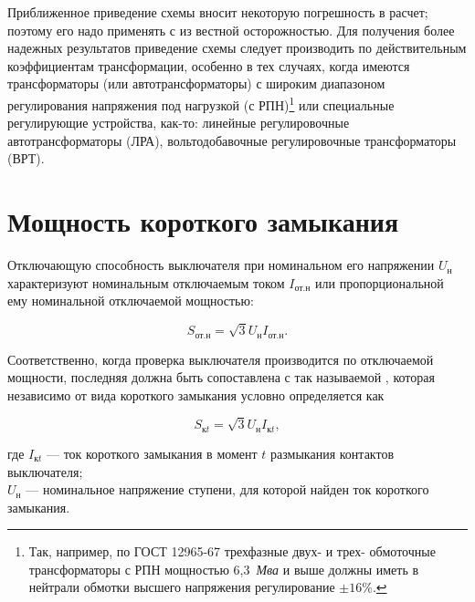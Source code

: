 Приближенное приведение схемы вносит некоторую погрешность в расчет; поэтому его надо применять с из вестной осторожностью. Для получения более надежных результатов приведение схемы следует производить по действительным коэффициентам трансформации, особенно в тех случаях, когда имеются трансформаторы (или автотрансформаторы) с широким диапазоном регулирования напряжения под нагрузкой (с РПН)\footnote{Так, например, по ГОСТ 12965-67 трехфазные двух- и трех- обмоточные трансформаторы с РПН мощностью 6,3~\textit{Мва} и выше должны иметь в нейтрали обмотки высшего напряжения регулирование $ \pm16\% $.} или специальные регулирующие устройства, как-то: линейные регулировочные автотрансформаторы (ЛРА), вольтодобавочные регулировочные трансформаторы (ВРТ).
















\section{Мощность короткого замыкания}
\label{sec:2-7 moshchnost korotkogo zamykaniia}

Отключающую способность выключателя при номинальном его напряжении $ U_{\text{н}} $ характеризуют номинальным отключаемым током $ I_{\text{от.н}} $ или пропорциональной ему номинальной отключаемой мощностью:

\begin{equation*}
	S_{\text{от.н}} = \sqrt{3}U_{\text{н}}I_{\text{от.н}}.
\end{equation*}

Соответственно, когда проверка выключателя производится по отключаемой мощности, последняя должна быть сопоставлена с так называемой , которая независимо от вида короткого замыкания условно определяется как

\begin{equation} %
	\label{eq:2-38 S_kz_v_moment_t}
	S_{\text{к}t} = \sqrt{3}U_{\text{н}}I_{\text{к}t},
\end{equation}

где $ I_{\text{к}t} $ --- ток короткого замыкания в момент $ t $ размыкания контактов выключателя; \\
$ U_{\text{н}} $ --- номинальное напряжение ступени, для которой найден ток короткого замыкания.

